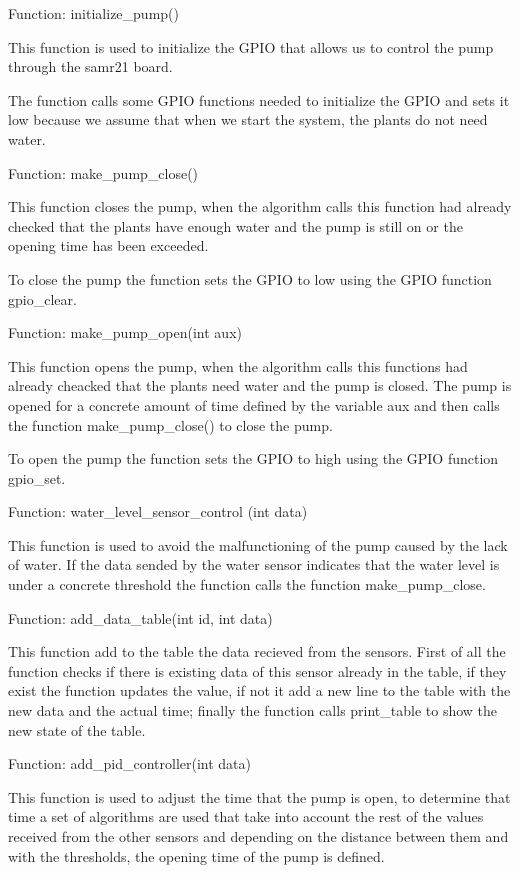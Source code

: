 \documentclass[11pt,paper=a4,parskip=half]{scrartcl}
\begin{document}
Function: initialize\_pump()

This function is used to initialize the GPIO that allows us to control the pump through the samr21 board.

The function calls some GPIO functions needed to initialize the GPIO and sets it low because we assume that when we start the system, the plants do not need water.

Function: make\_pump\_close()

This function closes the pump, when the algorithm calls this function had already checked that the plants have enough water and the pump is still on or the opening time has been exceeded.

To close the pump the function sets the GPIO to low using the GPIO function gpio\_clear.

Function: make\_pump\_open(int aux)

This function opens the pump, when the algorithm calls this functions had already cheacked that the plants need water and the pump is closed. The pump is opened for a concrete amount of time defined by the variable aux and then calls the function make\_pump\_close() to close the pump.

To open the pump the function sets the GPIO to high using the GPIO function gpio\_set.

Function: water\_level\_sensor\_control (int data)

This function is used to avoid the malfunctioning of the pump caused by the lack of water. If the data sended by the water sensor indicates that the water level is under a concrete threshold the function calls the function make\_pump\_close.

Function: add\_data\_table(int id, int data)

This function add to the table the data recieved from the sensors. First of all the function checks if there is existing data of this sensor already in the table, if they exist the function updates the value, if not it add a new line to the table with the new data and the actual time; finally the function calls print\_table to show the new state of the table.

Function: add\_pid\_controller(int data)

This function is used to adjust the time that the pump is open, to determine that time a set of algorithms are used that take into account the rest of the values received from the other sensors and depending on the distance between them and with the thresholds, the opening time of the pump is defined.
\end{document}
